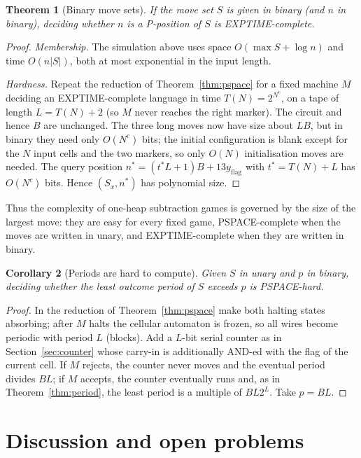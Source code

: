 \documentclass[11pt]{article}
\newtheorem{theorem}{Theorem}
\newtheorem{corollary}[theorem]{Corollary}
\theoremstyle{definition}
\begin{document}
\begin{theorem}[Binary move sets]\label{thm:exptime}
If the move set $S$ is given in binary (and $n$ in binary), deciding whether $n$ is a P-position of
$S$ is EXPTIME-complete.
\end{theorem}

\begin{proof}
\emph{Membership.}  The simulation above uses space $O(\max S+\log n)$ and time $O(n|S|)$, both at
most exponential in the input length.

\emph{Hardness.}  Repeat the reduction of Theorem~\ref{thm:pspace} for a fixed machine $M$ deciding an
EXPTIME-complete language in time $T(N)=2^{N^c}$, on a tape of length $L=T(N)+2$ (so $M$ never
reaches the right marker).  The circuit and hence $B$ are unchanged.  The three long moves now have
size about $LB$, but in binary they need only $O(N^c)$ bits; the initial configuration is blank
except for the $N$ input cells and the two markers, so only $O(N)$ initialisation moves are needed.
The query position $n^*=(t^*L+1)B+13y_{\mathrm{flag}}$ with $t^*=T(N)+L$ has $O(N^c)$ bits.  Hence
$(S_x,n^*)$ has polynomial size.
\end{proof}

Thus the complexity of one-heap subtraction games is governed by the size of the largest move: they
are easy for every fixed game, PSPACE-complete when the moves are written in unary, and
EXPTIME-complete when they are written in binary.

\begin{corollary}[Periods are hard to compute]\label{cor:perhard}
Given $S$ in unary and $p$ in binary, deciding whether the least outcome period of $S$ exceeds $p$
is PSPACE-hard.
\end{corollary}

\begin{proof}
In the reduction of Theorem~\ref{thm:pspace} make both halting states absorbing; after $M$ halts
the cellular automaton is frozen, so all wires become periodic with period $L$ (blocks).  Add a
$L$-bit serial counter as in Section~\ref{sec:counter} whose carry-in is additionally AND-ed with
the flag of the current cell.  If $M$ rejects, the counter never moves and the eventual period
divides $BL$; if $M$ accepts, the counter eventually runs and, as in Theorem~\ref{thm:period}, the
least period is a multiple of $BL2^L$.  Take $p=BL$.
\end{proof}

\section{Discussion and open problems}
\end{document}
